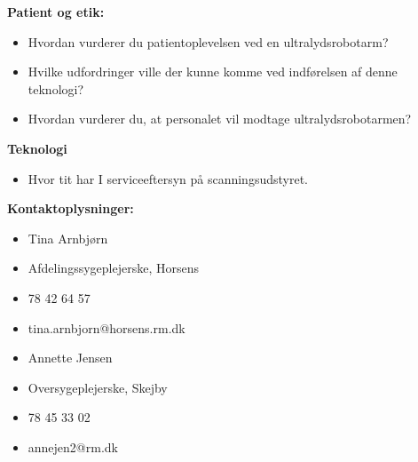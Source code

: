 \textbf{Patient og etik:}
\begin{itemize}
\item Hvordan vurderer du patientoplevelsen ved en ultralydsrobotarm?
\item Hvilke udfordringer ville der kunne komme ved indførelsen af denne teknologi? 
\item Hvordan vurderer du, at personalet vil modtage ultralydsrobotarmen?
\end{itemize}
\textbf{Teknologi}
\begin{itemize}
\item Hvor tit har I serviceeftersyn på scanningsudstyret.
\end{itemize}
\textbf{Kontaktoplysninger:}
\begin{itemize}
\item Tina Arnbjørn
\item Afdelingssygeplejerske, Horsens
\item 78 42 64 57
\item tina.arnbjorn@horsens.rm.dk
\end{itemize}
\begin{itemize}
\item Annette Jensen
\item Oversygeplejerske, Skejby
\item 78 45 33 02
\item annejen2@rm.dk
\end{itemize}
\newpage